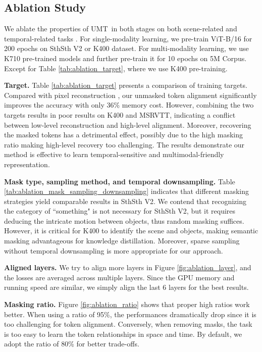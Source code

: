 \documentclass[10pt,twocolumn,letterpaper]{article}
\def\Modelnamelight{UMT}
\begin{document}
\subsection{Ablation Study}
We ablate the properties of \Modelnamelight\  in both stages on both scene-related \cite{k400,msrvtt} and temporal-related tasks \cite{sth,lei2022revealing}.
For single-modality learning, 
we pre-train ViT-B/16 for 200 epochs on SthSth V2 \cite{sth} or K400 \cite{k400} dataset. 
For multi-modality learning, 
we use K710 pre-trained models and further pre-train it for 10 epochs on 5M Corpus. 
Except for Table \ref{tab:ablation_target}, 
where we use K400 pre-training.

\textbf{Target.} 
Table \ref{tab:ablation_target} presents a comparison of training targets.
Compared with pixel reconstruction \cite{videomae},
our unmasked token alignment significantly improves the accuracy with only 36\% memory cost.
However,
combining the two targets results in poor results on K400 and MSRVTT,
indicating a conflict between low-level reconstruction and high-level alignment.
Moreover,
recovering the masked tokens has a detrimental effect,
possibly due to the high masking ratio making high-level recovery too challenging.
The results demonstrate our method is effective to learn temporal-sensitive and multimodal-friendly representation.

\textbf{Mask type, sampling method, and temporal downsampling.}
Table \ref{tab:ablation_mask_sampling_downsampling} indicates that different masking strategies yield comparable results in SthSth V2. 
We contend that recognizing the category of ``something" is not necessary for SthSth V2, but it requires deducing the intricate motion between objects, 
thus random masking suffices. 
However, 
it is critical for K400 to identify the scene and objects, 
making semantic masking advantageous for knowledge distillation. 
Moreover, 
sparse sampling without temporal downsampling is more appropriate for our approach.

\textbf{Aligned layers.}
We try to align more layers in Figure \ref{fig:ablation_layer},
and the losses are averaged across multiple layers.
Since the GPU memory and running speed are similar,
we simply align the last 6 layers for the best results.

\textbf{Masking ratio.}
Figure \ref{fig:ablation_ratio} shows that proper high ratios work better.
When using a ratio of 95\%,
the performances dramatically drop since it is too challenging for token alignment.
Conversely,
when removing masks,
the task is too easy to learn the token relationships in space and time.
By default,
we adopt the ratio of 80\% for better trade-offs.
\end{document}
